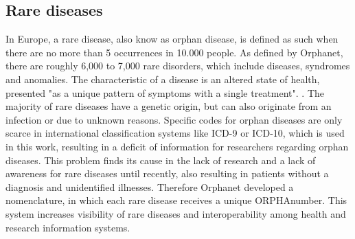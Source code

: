 \documentclass[11pt, a4paper]{book}
\begin{document}
\subsection{Rare diseases}
In Europe, a rare disease, also know as orphan disease, is defined as such when there are no more than 5 occurrences in 10.000 people. As defined by Orphanet, there are roughly 6,000 to 7,000 rare disorders, which include diseases, syndromes and anomalies. The characteristic of a disease is an altered state of health, presented "as a unique pattern of symptoms with a single treatment". \cite{Orphanet}. The majority of rare diseases have a genetic origin, but can also originate from an infection or due to unknown reasons. \cite{Orphanet} Specific codes for orphan diseases are only scarce in international classification systems like ICD-9 or ICD-10, which is used in this work, resulting in a deficit of information  for researchers regarding orphan diseases. This problem finds its cause in the lack of research and a lack of awareness for rare diseases until recently, also resulting in patients without a diagnosis and unidentified illnesses. \cite{Orphanet}
Therefore Orphanet developed a nomenclature, in which each rare disease receives a unique ORPHAnumber. This system increases visibility of rare diseases and interoperability among health and research information systems. \cite{Orphanet}
\end{document}
